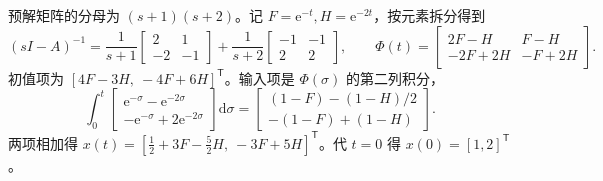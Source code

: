 \sol 预解矩阵的分母为 $(s+1)(s+2)$。记 $F=\mathrm e^{-t}, H=\mathrm e^{-2t}$，按元素拆分得到
\[
(sI-A)^{-1}=\frac{1}{s+1}\begin{bmatrix}2&1\\-2&-1\end{bmatrix}
+\frac{1}{s+2}\begin{bmatrix}-1&-1\\2&2\end{bmatrix},
\qquad
\Phi(t)=\begin{bmatrix}2F-H&F-H\\-2F+2H&-F+2H\end{bmatrix}.
\]
初值项为 $[4F-3H,\ -4F+6H]^{\mathsf T}$。输入项是 $\Phi(\sigma)$ 的第二列积分，
\[
\int_0^t\begin{bmatrix}\mathrm e^{-\sigma}-\mathrm e^{-2\sigma}\\
-\mathrm e^{-\sigma}+2\mathrm e^{-2\sigma}\end{bmatrix}\mathrm d\sigma
=\begin{bmatrix}(1-F)-(1-H)/2\\-(1-F)+(1-H)\end{bmatrix}.
\]
两项相加得 $x(t)=[\frac12+3F-\frac52 H,\ -3F+5H]^{\mathsf T}$。代 $t=0$ 得 $x(0)=[1,2]^{\mathsf T}$。



